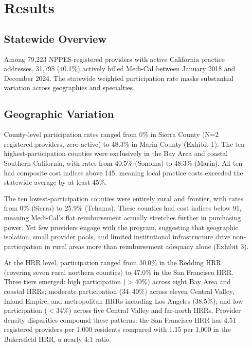 \documentclass[12pt]{article}
\begin{document}
\section{Results}

\subsection{Statewide Overview}

Among 79,223 NPPES-registered providers with active California practice addresses, 31,798 (40.1\%) actively billed Medi-Cal between January 2018 and December 2024. The statewide weighted participation rate masks substantial variation across geographies and specialties.

\subsection{Geographic Variation}

County-level participation rates ranged from 0\% in Sierra County (N=2 registered providers, zero active) to 48.3\% in Marin County (Exhibit 1). The ten highest-participation counties were exclusively in the Bay Area and coastal Southern California, with rates from 40.5\% (Sonoma) to 48.3\% (Marin). All ten had composite cost indices above 145, meaning local practice costs exceeded the statewide average by at least 45\%.

The ten lowest-participation counties were entirely rural and frontier, with rates from 0\% (Sierra) to 25.9\% (Tehama). These counties had cost indices below 91, meaning Medi-Cal's flat reimbursement actually stretches further in purchasing power. Yet few providers engage with the program, suggesting that geographic isolation, small provider pools, and limited institutional infrastructure drive non-participation in rural areas more than reimbursement adequacy alone (Exhibit 3).

At the HRR level, participation ranged from 30.0\% in the Redding HRR (covering seven rural northern counties) to 47.0\% in the San Francisco HRR. Three tiers emerged: high participation ($>$40\%) across eight Bay Area and coastal HRRs; moderate participation (34--40\%) across eleven Central Valley, Inland Empire, and metropolitan HRRs including Los Angeles (38.5\%); and low participation ($<$34\%) across five Central Valley and far-north HRRs. Provider density disparities compound these patterns: the San Francisco HRR has 4.51 registered providers per 1,000 residents compared with 1.15 per 1,000 in the Bakersfield HRR, a nearly 4:1 ratio.
\end{document}
